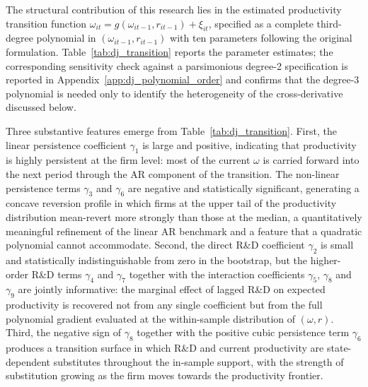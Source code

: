 \documentclass[a4paper, 12pt]{article}
\begin{document}
The structural contribution of this research lies in the estimated productivity transition function $\omega_{it} = g(\omega_{it-1}, r_{it-1}) + \xi_{it}$, specified as a complete third-degree polynomial in $(\omega_{it-1}, r_{it-1})$ with ten parameters following the original \textcite{doraszelski2013r} formulation. Table~\ref{tab:dj_transition} \hypertarget{target:dj_transition}{} reports the parameter estimates; the corresponding sensitivity check against a parsimonious degree-2 specification is reported in Appendix~\ref{app:dj_polynomial_order} and confirms that the degree-3 polynomial is needed only to identify the heterogeneity of the cross-derivative discussed below.

Three substantive features emerge from Table~\ref{tab:dj_transition}. First, the linear persistence coefficient $\gamma_1$ is large and positive, indicating that productivity is highly persistent at the firm level: most of the current $\omega$ is carried forward into the next period through the AR component of the transition. The non-linear persistence terms $\gamma_3$ and $\gamma_6$ are negative and statistically significant, generating a concave reversion profile in which firms at the upper tail of the productivity distribution mean-revert more strongly than those at the median, a quantitatively meaningful refinement of the linear AR benchmark and a feature that a quadratic polynomial cannot accommodate. Second, the direct R\&D coefficient $\gamma_2$ is small and statistically indistinguishable from zero in the bootstrap, but the higher-order R\&D terms $\gamma_4$ and $\gamma_7$ together with the interaction coefficients $\gamma_5$, $\gamma_8$ and $\gamma_9$ are jointly informative: the marginal effect of lagged R\&D on expected productivity is recovered not from any single coefficient but from the full polynomial gradient evaluated at the within-sample distribution of $(\omega, r)$. Third, the negative sign of $\gamma_8$ together with the positive cubic persistence term $\gamma_6$ produces a transition surface in which R\&D and current productivity are state-dependent substitutes throughout the in-sample support, with the strength of substitution growing as the firm moves towards the productivity frontier.
\end{document}
